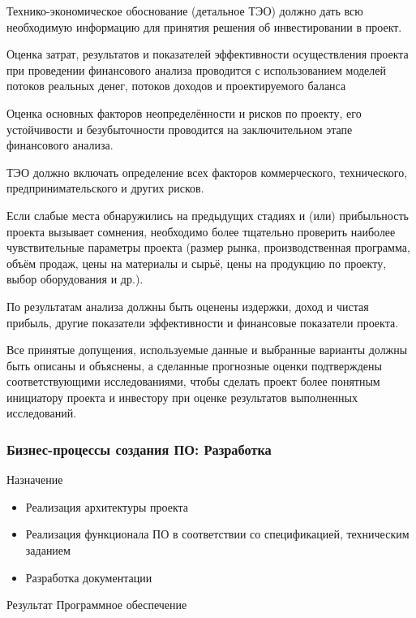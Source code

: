 \documentclass{../industrial-development}
\begin{document}
\lecturenotes

Технико-экономическое обоснование (детальное ТЭО) должно дать всю необходимую информацию для принятия решения об инвестировании в проект. 

Оценка затрат, результатов и показателей эффективности осуществления проекта при проведении финансового анализа проводится с использованием моделей потоков реальных денег, потоков доходов и проектируемого баланса

Оценка основных факторов неопределённости и рисков по проекту, его устойчивости и безубыточности проводится на заключительном этапе финансового анализа.

ТЭО должно включать определение всех факторов коммерческого, технического, предпринимательского и других рисков.

Если слабые места обнаружились на предыдущих стадиях и (или) прибыльность проекта вызывает сомнения, необходимо более тщательно проверить наиболее чувствительные параметры проекта (размер рынка, производственная программа, объём продаж, цены на материалы и сырьё, цены на продукцию по проекту, выбор оборудования и др.).

По результатам анализа должны быть оценены издержки, доход и чистая прибыль, другие показатели эффективности и финансовые показатели проекта.

Все принятые допущения, используемые данные и выбранные варианты должны быть описаны и объяснены, а сделанные прогнозные оценки подтверждены соответствующими исследованиями, чтобы сделать проект более понятным инициатору проекта и инвестору при оценке результатов выполненных исследований.


\begin{frame} \frametitle{Бизнес-процессы создания ПО: Разработка}
	\begin{block}{Назначение}
		\begin{itemize}
			\item Реализация архитектуры проекта
			\item Реализация функционала ПО в соответствии со спецификацией, техническим заданием
			\item Разработка документации
		\end{itemize}
	\end{block}
	\begin{block}{Результат}
		Программное обеспечение
	\end{block}
\end{frame}

\lecturenotes
\end{document}
